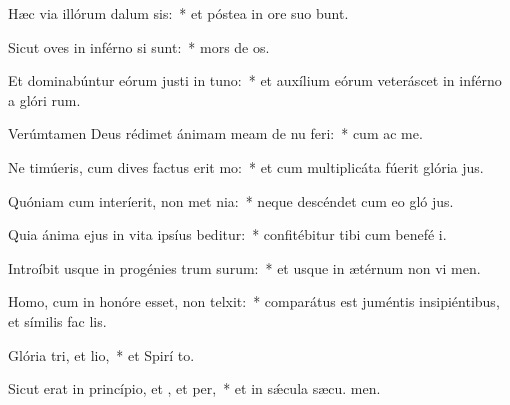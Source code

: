 \item Hæc via illórum dalum sis:~* et póstea in ore suo bunt.
\item Sicut oves in inférno si sunt:~* mors de os.
\item Et dominabúntur eórum justi in tuno:~* et auxílium eórum veteráscet in inférno a glóri rum.
\item Verúmtamen Deus rédimet ánimam meam de nu feri:~* cum ac me.
\item Ne timúeris, cum dives factus erit mo:~* et cum multiplicáta fúerit glória  jus.
\item Quóniam cum interíerit, non met nia:~* neque descéndet cum eo gló jus.
\item Quia ánima ejus in vita ipsíus beditur:~* confitébitur tibi cum benefé i.
\item Introíbit usque in progénies trum surum:~* et usque in ætérnum non vi men.
\item Homo, cum in honóre esset, non telxit:~* comparátus est juméntis insipiéntibus, et símilis fac  lis.
\item Glória tri, et lio,~* et Spirí to.
\item Sicut erat in princípio, et , et per,~* et in sǽcula sæcu. men.
